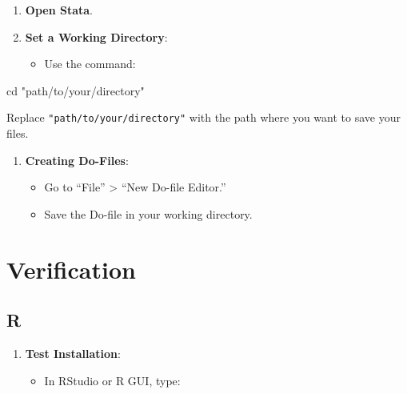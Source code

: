 \documentclass[
  letterpaper,
  DIV=11,
  numbers=noendperiod]{scrreprt}
\newenvironment{Shaded}{\begin{snugshade}}{\end{snugshade}}
\newcommand{\NormalTok}[1]{\textcolor[rgb]{0.00,0.23,0.31}{#1}}
\newcommand{\StringTok}[1]{\textcolor[rgb]{0.13,0.47,0.30}{#1}}
\providecommand{\tightlist}{%
  \setlength{\itemsep}{0pt}\setlength{\parskip}{0pt}}\usepackage{longtable,booktabs,array}
\begin{document}
\begin{enumerate}
\def\labelenumi{\arabic{enumi}.}
\tightlist
\item
  \textbf{Open Stata}.
\item
  \textbf{Set a Working Directory}:

  \begin{itemize}
  \tightlist
  \item
    Use the command:
  \end{itemize}
\end{enumerate}

\begin{Shaded}
\begin{Highlighting}[]
\NormalTok{   cd }\StringTok{"path/to/your/directory"}
\end{Highlighting}
\end{Shaded}

Replace \texttt{"path/to/your/directory"} with the path where you want
to save your files.

\begin{enumerate}
\def\labelenumi{\arabic{enumi}.}
\setcounter{enumi}{2}
\tightlist
\item
  \textbf{Creating Do-Files}:

  \begin{itemize}
  \tightlist
  \item
    Go to ``File'' \textgreater{} ``New Do-file Editor.''
  \item
    Save the Do-file in your working directory.
  \end{itemize}
\end{enumerate}

\section{Verification}\label{verification}

\subsection{R}\label{r}

\begin{enumerate}
\def\labelenumi{\arabic{enumi}.}
\tightlist
\item
  \textbf{Test Installation}:

  \begin{itemize}
  \tightlist
  \item
    In RStudio or R GUI, type:
  \end{itemize}
\end{enumerate}
\end{document}
